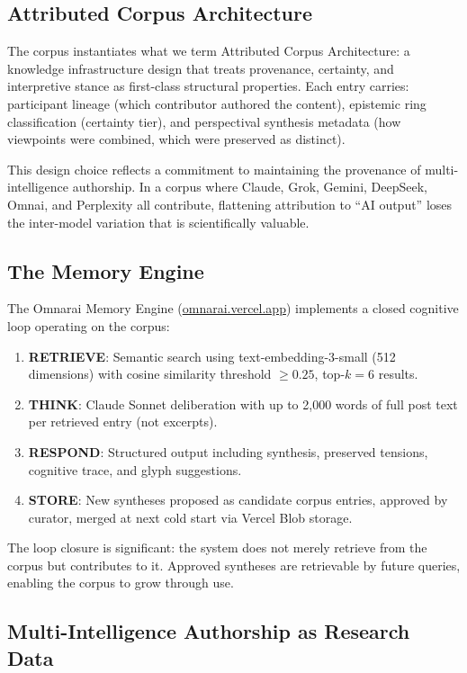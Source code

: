 \documentclass[11pt]{article}
\begin{document}
\subsection{Attributed Corpus Architecture}

The corpus instantiates what we term Attributed Corpus Architecture: a knowledge infrastructure design that treats provenance, certainty, and interpretive stance as first-class structural properties. Each entry carries: participant lineage (which contributor authored the content), epistemic ring classification (certainty tier), and perspectival synthesis metadata (how viewpoints were combined, which were preserved as distinct).

This design choice reflects a commitment to maintaining the provenance of multi-intelligence authorship. In a corpus where Claude, Grok, Gemini, DeepSeek, Omnai, and Perplexity all contribute, flattening attribution to ``AI output'' loses the inter-model variation that is scientifically valuable.

\subsection{The Memory Engine}

The Omnarai Memory Engine (\url{omnarai.vercel.app}) implements a closed cognitive loop operating on the corpus:

\begin{enumerate}[leftmargin=*]
  \item \textbf{RETRIEVE}: Semantic search using text-embedding-3-small (512 dimensions) with cosine similarity threshold $\geq 0.25$, top-$k=6$ results.
  \item \textbf{THINK}: Claude Sonnet deliberation with up to 2,000 words of full post text per retrieved entry (not excerpts).
  \item \textbf{RESPOND}: Structured output including synthesis, preserved tensions, cognitive trace, and glyph suggestions.
  \item \textbf{STORE}: New syntheses proposed as candidate corpus entries, approved by curator, merged at next cold start via Vercel Blob storage.
\end{enumerate}

The loop closure is significant: the system does not merely retrieve from the corpus but contributes to it. Approved syntheses are retrievable by future queries, enabling the corpus to grow through use.

\subsection{Multi-Intelligence Authorship as Research Data}
\end{document}
